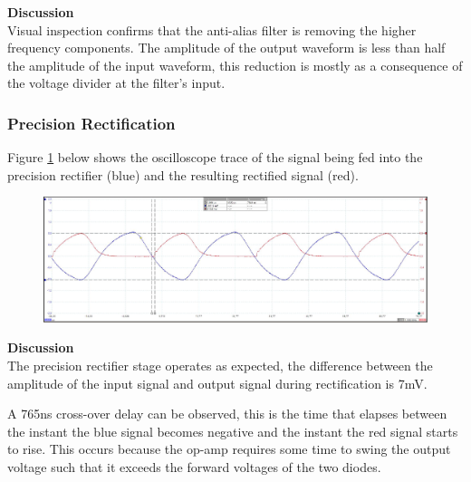\textbf{Discussion}\\
Visual inspection confirms that the anti-alias filter is removing the higher frequency components. The amplitude of the output waveform is less than half the amplitude of the input waveform, this reduction is mostly as a consequence of the voltage divider at the filter's input.

\subsubsection{Precision Rectification}

Figure \ref{fig:precision_rectification} below shows the oscilloscope trace of the signal being fed into the precision rectifier (blue) and the resulting rectified signal (red).

\begin{figure}[H]
	\centering
	\includegraphics[width=\textwidth]{figures/results/rectification/36kHz.JPG}
	\label{fig:precision_rectification}
\end{figure}

\textbf{Discussion}\\
The precision rectifier stage operates as expected, the difference between the amplitude of the input signal and output signal during rectification is 7mV.

A 765ns cross-over delay can be observed, this is the time that elapses between the instant the blue signal becomes negative and the instant the red signal starts to rise. This occurs because the op-amp requires some time to swing the output voltage such that it exceeds the forward voltages of the two diodes.








